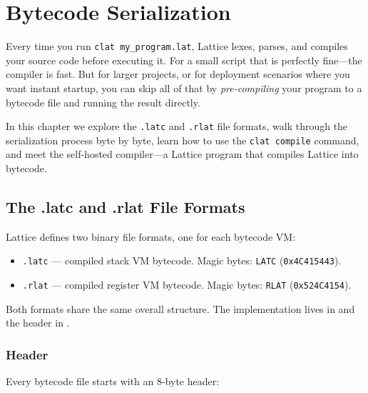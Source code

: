 \chapter{Bytecode Serialization}\label{ch:bytecode-serialization}


Every time you run \lstinline|clat my_program.lat|, Lattice lexes, parses, and compiles your source code before executing it.
For a small script that is perfectly fine---the compiler is fast.
But for larger projects, or for deployment scenarios where you want instant startup, you can skip all of that by \emph{pre-compiling} your program to a bytecode file and running the result directly.

In this chapter we explore the \lstinline|.latc| and \lstinline|.rlat| file formats, walk through the serialization process byte by byte, learn how to use the \lstinline|clat compile| command, and meet the self-hosted compiler---a Lattice program that compiles Lattice into bytecode.

\section{The .latc and .rlat File Formats}\label{sec:file-formats}

Lattice defines two binary file formats, one for each bytecode VM:

\begin{itemize}
  \item \lstinline|.latc| --- compiled stack VM bytecode. Magic bytes: \texttt{LATC} (\texttt{0x4C415443}).
  \item \lstinline|.rlat| --- compiled register VM bytecode. Magic bytes: \texttt{RLAT} (\texttt{0x524C4154}).
\end{itemize}

Both formats share the same overall structure. The implementation lives in  and the header in .

\subsection{Header}

Every bytecode file starts with an 8-byte header:

